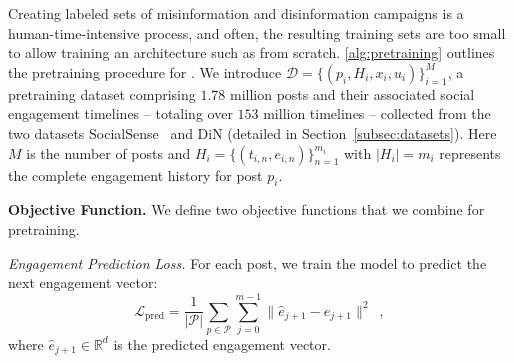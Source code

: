Creating labeled sets of misinformation and disinformation campaigns is a human-time-intensive process, and often, the resulting training sets are too small to allow training an architecture such as \icmamba from scratch.
\cref{alg:pretraining} outlines the pretraining procedure for \icmamba.
We introduce $\mathcal{D} = \{(p_i, H_i, x_i, u_i)\}_{i=1}^M$, a pretraining dataset comprising $1.78$ million posts and their associated social engagement timelines -- totaling over $153$ million timelines -- collected from the two datasets SocialSense~\citep{kong2022slipping} and DiN (detailed in Section~\ref{subsec:datasets}).
Here $M$ is the number of posts and $H_i = \{(t_{i,n}, e_{i,n})\}_{n=1}^{m_i}$ with $|H_i| = m_i$ represents the complete engagement history for post $p_i$.



\noindent\textbf{Objective Function.}
We define two objective functions that we combine for pretraining.

\emph{Engagement Prediction Loss.} 
For each post, we train the model to predict the next engagement vector:
\begin{equation}
  \label{eq:loss_next_pred}
        \mathcal{L}_\text{pred} = \frac{1}{|\mathcal{P}|} \sum_{p \in \mathcal{P}} \sum_{j=0}^{m-1} \|\hat{e}_{j+1} - e_{j+1}\|^2 \enspace,
\end{equation}
where $\hat{e}_{j+1} \in \mathbb{R}^d$ is the predicted engagement vector.

